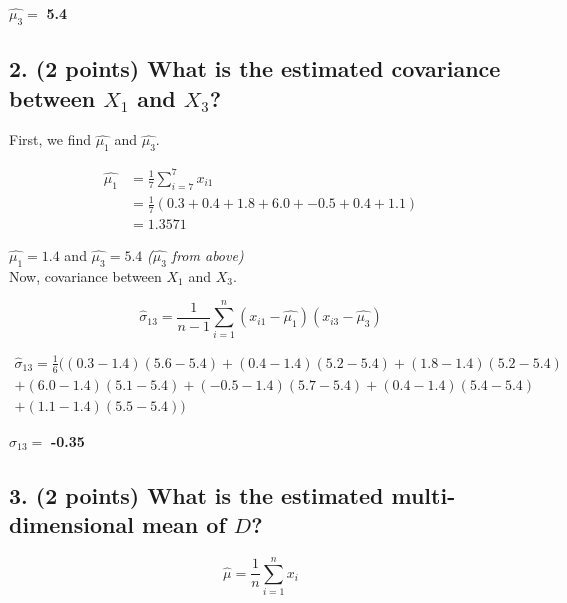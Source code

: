 \documentclass[11pt]{article}
\begin{document}
\begin{tcolorbox}[title=Problem 2.1]
    $\hat{\mu_3} = $ \textbf{5.4}
\end{tcolorbox}

\newpage
\subsection*{\textbf{2. (2 points)} What is the estimated covariance between $X_1$ and $X_3$?}

First, we find $\hat{\mu_1}$ and $\hat{\mu_3}$.

\begin{align*}
    \hat{\mu_1} & = \frac{1}{7} \sum_{i=7}^{7} x_{i1} \\
    & = \frac{1}{7}(0.3 + 0.4 + 1.8 + 6.0 + -0.5 + 0.4 + 1.1) \\
    & = 1.3571
\end{align*}

$\hat{\mu_1} = 1.4$ and $\hat{\mu_3} = 5.4$ \textit{($\hat{\mu_3}$ from above)} \\

Now, covariance between $X_1$ and $X_3$.

$$\hat{\sigma}_{13} = \frac{1}{n-1}\sum_{i=1}^{n} (x_{i1} - \hat{\mu_1})(x_{i3} - \hat{\mu_3})$$

\begin{multline*}
    \hat{\sigma}_{13} = \frac{1}{6}( 
        (0.3 - 1.4)(5.6 - 5.4) + (0.4 - 1.4)(5.2 - 5.4) + (1.8 - 1.4)(5.2 - 5.4) \\
        + (6.0 - 1.4)(5.1 - 5.4) + (-0.5 - 1.4)(5.7 - 5.4) + (0.4 - 1.4)(5.4 - 5.4) \\
        + (1.1 - 1.4)(5.5 - 5.4) )
\end{multline*}

\begin{tcolorbox}[title=Problem 2.2]
    $\hat{\sigma}_{13} = $ \textbf{-0.35}
\end{tcolorbox}

\subsection*{\textbf{3. (2 points)} What is the estimated multi-dimensional mean of $D$?}

$$\hat{\mu} = \frac{1}{n} \sum_{i=1}^{n} x_{i}$$

\end{document}
